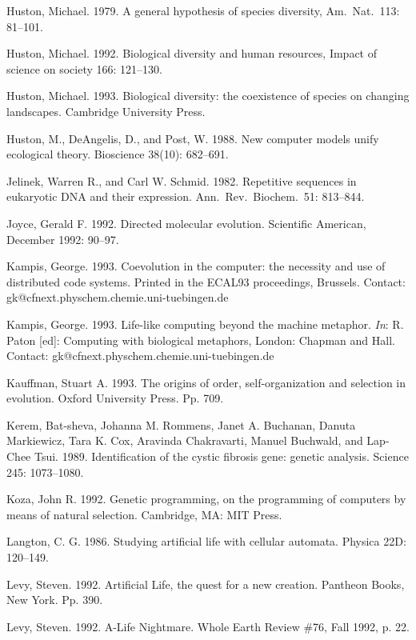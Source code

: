 \begin{thebibliography}{99}
Huston, Michael.  1979.  A general hypothesis of species diversity,
Am.\ Nat.\ 113: 81--101.

Huston, Michael.  1992.  Biological diversity and human resources,
Impact of science on society 166: 121--130.

Huston, Michael.  1993.  Biological diversity: the coexistence of
species on changing landscapes.  Cambridge University Press.

Huston, M., DeAngelis, D., and Post, W.  1988.  New computer models
unify ecological theory.  Bioscience 38(10): 682--691.

Jelinek, Warren R., and Carl W. Schmid.  1982.  Repetitive sequences in
eukaryotic DNA and their expression.  Ann.\ Rev.\ Biochem.\ 51: 813--844.

Joyce, Gerald F.  1992.  Directed molecular evolution.  Scientific
American, December 1992: 90--97.

Kampis, George.  1993.  Coevolution in the computer: the necessity and
use of distributed code systems.  Printed in the ECAL93 proceedings,
Brussels.  Contact: gk@cfnext.physchem.chemie.uni-tuebingen.de

Kampis, George.  1993.  Life-like computing beyond the machine metaphor.
{\em In}: R. Paton [ed]: Computing with biological metaphors, London:
Chapman and Hall.  Contact: gk@cfnext.physchem.chemie.uni-tuebingen.de

Kauffman, Stuart A.  1993.  The origins of order, self-organization and
selection in evolution.  Oxford University Press. Pp. 709.

Kerem, Bat-sheva, Johanna M. Rommens, Janet A. Buchanan, Danuta Markiewicz,
Tara K. Cox, Aravinda Chakravarti, Manuel Buchwald, and Lap-Chee Tsui.
1989.  Identification of the cystic fibrosis gene: genetic analysis.
Science 245: 1073--1080.

Koza, John R.  1992.  Genetic programming, on the programming of
computers by means of natural selection.  Cambridge, MA: MIT Press.

Langton, C. G.  1986.  Studying artificial life with cellular automata.
Physica 22D: 120--149.

Levy, Steven.  1992.  Artificial Life, the quest for a new creation.
Pantheon Books, New York.  Pp. 390.

Levy, Steven.  1992.  A-Life Nightmare.  Whole Earth Review \#76,
Fall 1992, p. 22.


\end{thebibliography}
